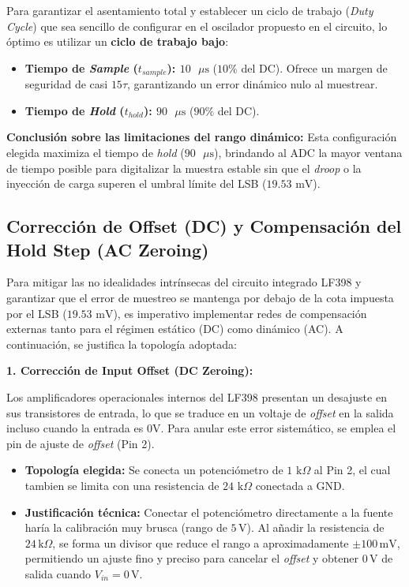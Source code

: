 Para garantizar el asentamiento total y establecer un ciclo de trabajo (\textit{Duty Cycle}) que sea sencillo de configurar en el oscilador propuesto en el circuito, lo óptimo es utilizar un \textbf{ciclo de trabajo bajo}:

\begin{itemize}
	\item \textbf{Tiempo de \textit{Sample} ($t_{sample}$): $10\text{ }\mu\text{s}$} ($10\%$ del DC). Ofrece un margen de seguridad de casi $15\tau$, garantizando un error dinámico nulo al muestrear.
	\item \textbf{Tiempo de \textit{Hold} ($t_{hold}$): $90\text{ }\mu\text{s}$} ($90\%$ del DC). 
\end{itemize}

\textbf{Conclusión sobre las limitaciones del rango dinámico:} 
Esta configuración elegida maximiza el tiempo de \textit{hold} ($90\text{ }\mu\text{s}$), brindando al ADC la mayor ventana de tiempo posible para digitalizar la muestra estable sin que el \textit{droop} o la inyección de carga superen el umbral límite del LSB ($19.53\text{ mV}$).
\subsection{Corrección de Offset (DC) y Compensación del Hold Step (AC Zeroing)}

Para mitigar las no idealidades intrínsecas del circuito integrado LF398 y garantizar que el error de muestreo se mantenga por debajo de la cota impuesta por el LSB ($19.53\text{ mV}$), es imperativo implementar redes de compensación externas tanto para el régimen estático (DC) como dinámico (AC). A continuación, se justifica la topología adoptada:

\textbf{1. Corrección de Input Offset (DC Zeroing):}

Los amplificadores operacionales internos del LF398 presentan un desajuste en sus transistores de entrada, lo que se traduce en un voltaje de \textit{offset} en la salida incluso cuando la entrada es $0\text{V}$. Para anular este error sistemático, se emplea el pin de ajuste de \textit{offset} (Pin 2).

\begin{itemize}
	\item \textbf{Topología elegida:} Se conecta un potenciómetro de $1\text{ k}\Omega$ al Pin 2, el cual tambien se limita con una resistencia de $24\text{ k}\Omega$ conectada a GND.
	\item \textbf{Justificación técnica:} Conectar el potenciómetro directamente a la fuente haría la calibración muy brusca (rango de $5\,\text{V}$). Al añadir la resistencia de $24\,\text{k}\Omega$, se forma un divisor que reduce el rango a aproximadamente $\pm 100\,\text{mV}$, permitiendo un ajuste fino y preciso para cancelar el \textit{offset} y obtener $0\,\text{V}$ de salida cuando $V_{in} = 0\,\text{V}$.
\end{itemize}


